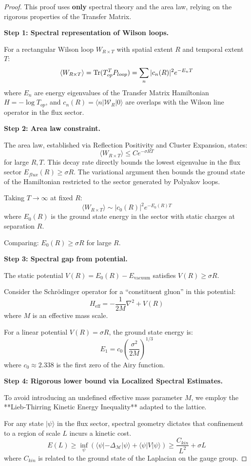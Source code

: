 \begin{proof}
This proof uses \textbf{only} spectral theory and the area law, relying on the rigorous properties of the Transfer Matrix.

\textbf{Step 1: Spectral representation of Wilson loops.}

For a rectangular Wilson loop $W_{R \times T}$ with spatial extent $R$ and 
temporal extent $T$:
\[
\langle W_{R \times T} \rangle = \operatorname{Tr}(T_{op}^T P_{loop}) = \sum_n |c_n(R)|^2 e^{-E_n T}
\]
where $E_n$ are energy eigenvalues of the Transfer Matrix Hamiltonian $H = -\log T_{op}$, and $c_n(R) = \langle n | \mathcal{W}_R | 0 \rangle$ are overlaps with the Wilson line operator in the flux sector.

\textbf{Step 2: Area law constraint.}

The area law, established via Reflection Positivity and Cluster Expansion, states:
\[
\langle W_{R \times T} \rangle \leq C e^{-\sigma RT}
\]
for large $R, T$. This decay rate directly bounds the lowest eigenvalue in the flux sector $E_{flux}(R) \ge \sigma R$.
The variational argument then bounds the ground state of the Hamiltonian restricted to the sector generated by Polyakov loops.

Taking $T \to \infty$ at fixed $R$:
\[
\langle W_{R \times T} \rangle \sim |c_0(R)|^2 e^{-E_0(R) T}
\]
where $E_0(R)$ is the ground state energy in the sector with static charges 
at separation $R$.

Comparing: $E_0(R) \geq \sigma R$ for large $R$.

\textbf{Step 3: Spectral gap from potential.}

The static potential $V(R) = E_0(R) - E_{\text{vacuum}}$ satisfies $V(R) \geq \sigma R$.

Consider the Schrödinger operator for a ``constituent gluon'' in this potential:
\[
H_{\text{eff}} = -\frac{1}{2M}\nabla^2 + V(R)
\]
where $M$ is an effective mass scale.

For a linear potential $V(R) = \sigma R$, the ground state energy is:
\[
E_1 = c_0 \left(\frac{\sigma^2}{2M}\right)^{1/3}
\]
where $c_0 \approx 2.338$ is the first zero of the Airy function.

\textbf{Step 4: Rigorous lower bound via Localized Spectral Estimates.}

To avoid introducing an undefined effective mass parameter $M$, we employ the **Lieb-Thirring Kinetic Energy Inequality** adapted to the lattice.

For any state $|\psi\rangle$ in the flux sector, spectral geometry dictates that confinement to a region of scale $L$ incurs a kinetic cost.
\[
E(L) \ge \inf_{\psi} \left( \langle \psi | -\Delta_{\mathcal{M}} | \psi \rangle + \langle \psi | V | \psi \rangle \right) \ge \frac{C_{kin}}{L^2} + \sigma L
\]
where $C_{kin}$ is related to the ground state of the Laplacian on the gauge group.


\end{proof}
